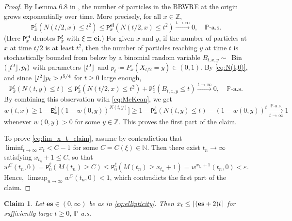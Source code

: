 \documentclass[12pt,reqno,oneside]{amsart}
\numberwithin{equation}{section}
\newtheorem{claim}[theorem]{Claim}
\theoremstyle{definition}
\theoremstyle{remark}
\newcommand{\N}{\mathbb{N}}
\newcommand{\Z}{\mathbb{Z}}
\newcommand{\PP}{\mathbb{P}}
\newcommand{\es}{\mathbf{es}}
\newcommand{\ei}{\mathbf{ei}}
\DeclarePairedDelimiter{\ceil}{\lceil}{\rceil}
\DeclarePairedDelimiter{\floor}{\lfloor}{\rfloor}
\begin{document}
\begin{proof}
  By Lemma 6.8 in \cite{CD20}, the number of particles
  in the BRWRE
  at the origin grows exponentially over time. More precisely, for all $x \in \Z$,
  \begin{equation}\label{eq:N(t,0)}
     \mathtt{P}_x^\xi(N(t/2,x) \leq t^2) \leq \mathtt{P}_x^\ei(N(t/2,x)\leq t^2)
    \xrightarrow[]{t \rightarrow \infty}0, \quad \PP\text{-a.s.}
  \end{equation}
  (Here $\mathtt{P}_x^\ei$ denotes $\mathtt{P}_x^\xi$ with $\xi \equiv\ei$.)
  For given $x$ and $y$, if the number of particles at $x$ at time $t/2$ is
  at least $t^2$, then the number of particles reaching $y$ at time $t$ is
  stochastically bounded from below by a binomial random variable
  $B_{t,x,y}\sim$~Bin~$(\floor{ t^2 },p_t)$ with parameters
  $\floor{ t^2}  $ and $p_t\coloneq P_x(X_{t/2}=y) \in
  (0,1)$. By \eqref{eq:N(t,0)}, and since $\floor{ t^2 }
  p_t>t^{5/4}$ for $t\geq0$ large enough,
  \begin{equation*}
    \mathtt{P}^{\xi}_x(N(t,y) \leq t) \leq
    \mathtt{P}^{\xi}_x(N(t/2,x) \leq t^2)
    + \mathtt{P}^{\xi}_x( B_{t,x,y} \leq t)
    \xrightarrow{t \rightarrow \infty} 0,
    \quad \PP\text{-a.s.}
  \end{equation*}
  By combining this observation with \eqref{eq:McKean}, we get
  \begin{equation*}
    w(t,x) \geq 1- \mathtt{E}_x^{\xi}\big[(1-w(0,y))^{N(t,y)}\big]
    \geq 1- \mathtt{P}_x^{\xi}(N(t,y) \leq t) - (1-w(0,y))^t
    \xrightarrow[t \rightarrow \infty]{\PP\text{-a.s.}} 1
  \end{equation*}
  whenever $w(0,y) > 0$ for some $y \in \Z$. This proves the first part of
  the claim.

  To prove \eqref{eq:lim_x_t_claim}, assume by contradiction that
  $\liminf_{t \rightarrow \infty}{x_t}< C-1$ for some $C=C(\xi)\in \N$. Then
  there exist $t_n \rightarrow \infty$ satisfying $x_{t_n} +1\leq C$, so that
  \begin{equation*}
    w^C(t_n,0) = \mathtt{P}^\xi_0(M(t_n) \geq C)
    \leq \mathtt{P}^\xi_0(M(t_n) \geq x_{t_n} +1)
    = w^{x_{t_n}+1}({t_n},0) < \varepsilon.
  \end{equation*}
  Hence, $\limsup_{n \rightarrow \infty} w^C(t_n,0) < 1$, which contradicts
  the first part of the claim.
\end{proof}

\begin{claim}
  \label{claim:v_2}
  Let $\es \in (0,\infty)$ be as in \eqref{eq:ellipticity}. Then
  $x_t \leq \ceil{(\es+2)t} $ for sufficiently large $t \geq 0$,
  $\PP$-a.s.
\end{claim}
\end{document}
